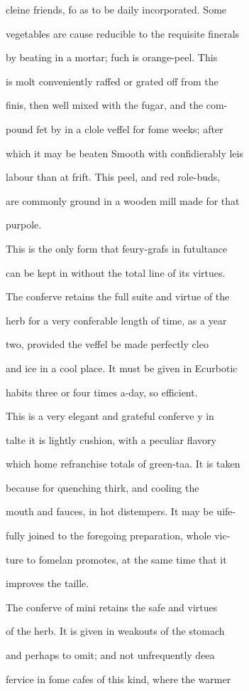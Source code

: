\documentclass{article}
\begin{document}
cleine friends, fo as to be daily incorporated. Some

vegetables are cause reducible to the requisite finerals

by beating in a mortar; fuch is orange-peel. This

is molt conveniently raffed or grated off from the

finis, then well mixed with the fugar, and the com-

pound fet by in a clole veffel for fome weeks; after

which it may be beaten Smooth with confidierably leis

labour than at frift. This peel, and red role-buds,

are commonly ground in a wooden mill made for that

purpole.

This is the only form that feury-grafs in futultance

can be kept in without the total line of its virtues.

The conferve retains the full suite and virtue of the

herb for a very conferable length of time, as a year

two, provided the veffel be made perfectly cleo

and ice in a cool place. It must be given in Ecurbotic

habits three or four times a-day, so efficient.

This is a very elegant and grateful conferve y in

talte it is lightly cushion, with a peculiar flavory

which home refranchise totals of green-taa. It is taken

because for quenching thirk, and cooling the

mouth and fauces, in hot distempers. It may be uife-

fully joined to the foregoing preparation, whole vic-

ture to fomelan promotes, at the same time that it

improves the taille.

The conferve of mini retains the safe and virtues

of the herb. It is given in weakouts of the stomach

and perhaps to omit; and not unfrequently deea

fervice in fome cafes of this kind, where the warmer
\end{document}
